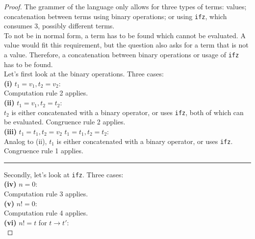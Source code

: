 \documentclass{article}
\begin{document}
\begin{proof}

The grammer of the language only allows for three types of terms: values; concatenation between terms using binary operations; or using \texttt{ifz}, which consumes 3, possibly different terms. \\

To not be in normal form, a term has to be found which cannot be evaluated. A value would fit this requirement, but the question also asks for a term that is not a value. Therefore, a concatenation between binary operations or usage of \texttt{ifz} has to be found. \\

Let's first look at the binary operations. Three cases: \\

\textbf{(i)} $t_1 = v_1, t_2 = v_2$: \\

Computation rule 2 applies.\\

\textbf{(ii)} $t_1 = v_1, t_2 = t_2$: \\

$t_2$ is either concatenated with a binary operator, or uses \texttt{ifz}, both of which can be evaluated. Congruence rule 2 applies. \\

\textbf{(iii)} $t_1 = t_1, t_2 = v_2$ \lor $t_1 = t_1, t_2 = t_2$:\\

Analog to (ii), $t_1$ is either concatenated with a binary operator, or uses \texttt{ifz}. Congruence rule 1 applies. \\

\hrule
\vspace{1em}

Secondly, let's look at \texttt{ifz}. Three cases: \\

\textbf{(iv)} $n = 0$: \\

Computation rule 3 applies. \\

\textbf{(v)} $n != 0$: \\

Computation rule 4 applies. \\

\textbf{(vi)} $n != t$ for $t \to t'$: \\


\end{proof}
\end{document}
